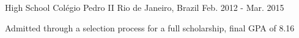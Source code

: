   \cventry
    {High School} %
    {Colégio Pedro II} %
    {Rio de Janeiro, Brazil} %
    {Feb. 2012 - Mar. 2015} %
    {
      \begin{cvitems} %
        \item {Admitted through a selection process for a full scholarship, final GPA of 8.16}
      \end{cvitems}
    }

